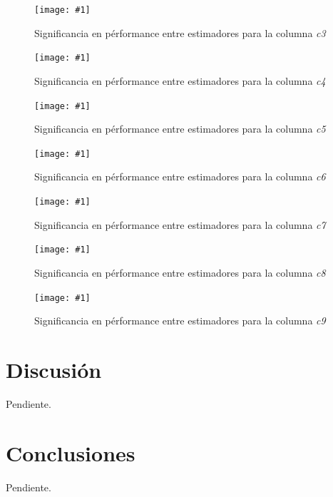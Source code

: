 \documentclass[a4paper, 10pt, twoside]{article}
\newcommand{\grafico}[3]{
  \begin{figure}[H]
    \texttt{[image: \#1]}
    \caption{#2}
    \label{#3}
  \end{figure}
}
\begin{document}
\grafico{plot-significance-c3}
        {Significancia en pérformance entre estimadores para la columna \emph{c3}}
        {student-columna-c3}

\grafico{plot-significance-c4}
        {Significancia en pérformance entre estimadores para la columna \emph{c4}}
        {student-columna-c4}

\grafico{plot-significance-c5}
        {Significancia en pérformance entre estimadores para la columna \emph{c5}}
        {student-columna-c5}

\grafico{plot-significance-c6}
        {Significancia en pérformance entre estimadores para la columna \emph{c6}}
        {student-columna-c6}

\grafico{plot-significance-c7}
        {Significancia en pérformance entre estimadores para la columna \emph{c7}}
        {student-columna-c7}

\grafico{plot-significance-c8}
        {Significancia en pérformance entre estimadores para la columna \emph{c8}}
        {student-columna-c8}

\grafico{plot-significance-c9}
        {Significancia en pérformance entre estimadores para la columna \emph{c9}}
        {student-columna-c9}



\section{Discusión}

Pendiente.




\section{Conclusiones}

Pendiente.
\end{document}
